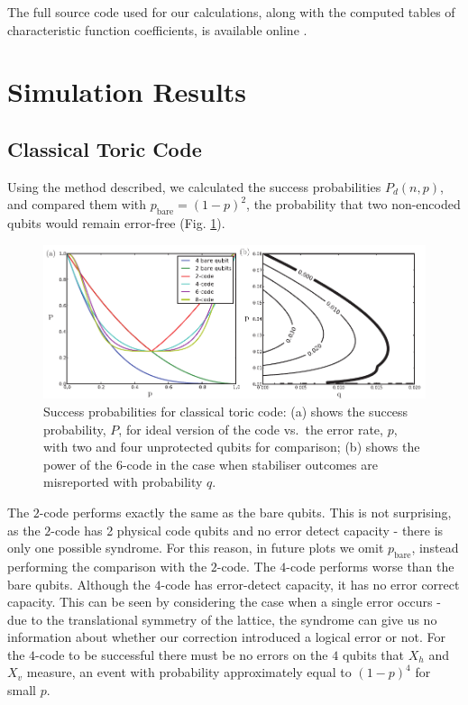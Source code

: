The full source code used for our calculations, along with the computed tables of characteristic function coefficients, is available online \cite{toric_code_program}.

\section{Simulation Results}

\subsection{Classical Toric Code}

Using the method described, we calculated the success probabilities $P_d(n, p)$, and compared them with $p_{\text{bare}} = (1-p)^2$, the probability that two non-encoded qubits would remain error-free (Fig. \ref{x_results}).
\begin{figure}[htb]
  \begin{center}
    \includegraphics{figures/x_results.pdf}
  \end{center}
  \caption{Success probabilities for classical toric code: (a) shows the success probability, $P$, for ideal version of the code vs.\ the error rate, $p$, with two and four unprotected qubits for comparison; (b) shows the power of the $6$-code in the case when stabiliser outcomes are misreported with probability $q$.}
  \label{x_results}
\end{figure}

The $2$-code performs exactly the same as the bare qubits. This is not surprising, as the $2$-code has 2 physical code qubits and no error detect capacity - there is only one possible syndrome. For this reason, in future plots we omit $p_\text{bare}$, instead performing the comparison with the $2$-code. The $4$-code performs worse than the bare qubits. Although the $4$-code has error-detect capacity, it has no error correct capacity. This can be seen by considering the case when a single error occurs - due to the translational symmetry of the lattice, the syndrome can give us no information about whether our correction introduced a logical error or not. For the $4$-code to be successful there must be no errors on the $4$ qubits that $X_h$ and $X_v$ measure, an event with probability approximately equal to $(1-p)^4$ for small $p$.


